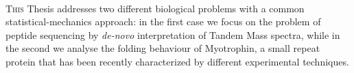 \nopagebreak

%


\paragraph{} %
\lettrine{T}{his} Thesis 
addresses
two different %
biological
problems with a common statistical-mechanics approach: in the first case we focus
on the problem of peptide
sequencing by {\sl de-novo} interpretation of Tandem %
Mass spectra, while in the second we 
analyse the folding behaviour of Myotrophin, a small repeat protein that has been recently characterized by different experimental techniques.

